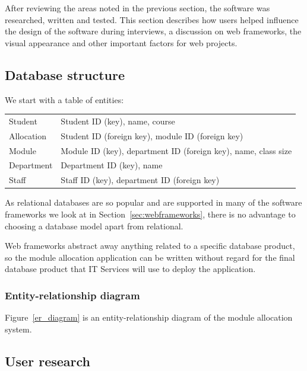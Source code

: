 \documentclass[draft]{scrartcl}
\begin{document}

After reviewing the areas noted in the previous section, the software was
researched, written and tested. This section describes how users helped
influence the design of the software during interviews, a discussion on web
frameworks, the visual appearance and other important factors for web
projects.

\subsection{Database structure}

We start with a table of entities:

\begin{tabular}{ l l }
  Student    & Student ID (key), name, course \\
  Allocation & Student ID (foreign key), module ID (foreign key) \\
  Module     & Module ID (key), department ID (foreign key), name, class size \\
  Department & Department ID (key), name \\
  Staff      & Staff ID (key), department ID (foreign key) \\
\end{tabular}

As relational databases are so popular and are supported in many of the
software frameworks we look at in Section~\ref{sec:webframeworks}, there is no
advantage to choosing a database model apart from relational.

Web frameworks abstract away anything related to a specific database product,
so the module allocation application can be written without regard for the
final database product that IT Services will use to deploy the application.

\subsubsection{Entity-relationship diagram}

Figure~\ref{er_diagram} is an entity-relationship diagram of the module
allocation system.



\subsection{User research}
\end{document}
